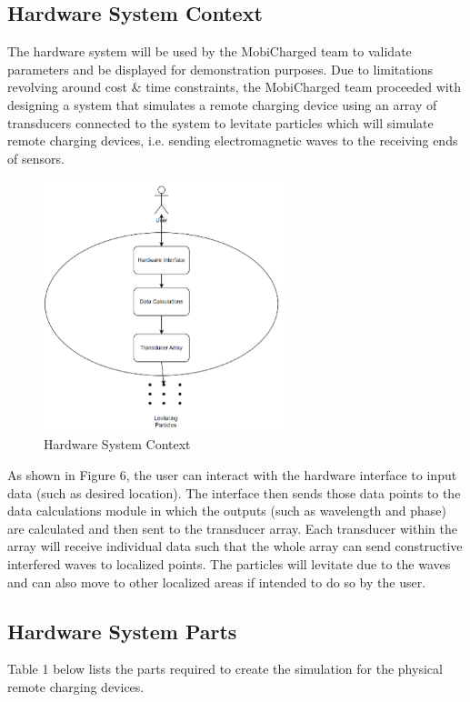 \documentclass[12pt, titlepage]{article}
\begin{document}
\subsection{Hardware System Context}
The hardware system will be used by the MobiCharged team to validate parameters and be displayed for demonstration purposes. Due to limitations revolving around cost \& time constraints, the MobiCharged team proceeded with designing a system that simulates a remote charging device using an array of transducers connected to the system to levitate particles which will simulate remote charging devices, i.e. sending electromagnetic waves to the receiving ends of sensors. 

\begin{figure}[htp]
  \centering
  \includegraphics[width=7cm]{images/HardwareContext.png}
  \caption[Hardware Context]{Hardware System Context}
  \label{fig:figure6}
\end{figure}

As shown in Figure 6, the user can interact with the hardware interface to input data (such as desired location). The interface then sends those data points to the data calculations module in which the outputs (such as wavelength and phase) are calculated and then sent to the transducer array. Each transducer within the array will receive individual data such that the whole array can send constructive interfered waves to localized points. The particles will levitate due to the waves and can also move to other localized areas if intended to do so by the user. 

\subsection{Hardware System Parts}

Table 1 below lists the parts required to create the simulation for the physical remote charging devices. 
\end{document}
